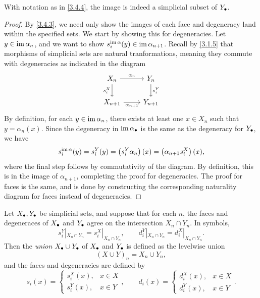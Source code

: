 \begin{claim}\label{3.4.5}
    With notation as in \cref{3.4.4}, the image is indeed a simplicial subset of $Y_\bullet$.
\end{claim}
\begin{proof}
    By \cref{3.4.3}, we need only show the images of each face and degeneracy land within the specified sets. We start by showing this for degeneracies. Let $y\in\operatorname{im}\alpha_n$, and we want to show $s_i^{\operatorname{im}\alpha}(y)\in\operatorname{im}\alpha_{n+1}$. Recall by \cref{3.1.5} that morphisms of simplicial sets are natural tranformations, meaning they commute with degeneracies as indicated in the diagram
    \[\begin{tikzcd}
	{X_n} & {Y_n} \\
	{X_{n+1}} & {Y_{n+1}}
	\arrow["{\alpha_n}", from=1-1, to=1-2]
	\arrow["{s_i^X}"', from=1-1, to=2-1]
	\arrow["{s_i^Y}", from=1-2, to=2-2]
	\arrow["{\alpha_{n+1}}"', from=2-1, to=2-2]
    \end{tikzcd}\]
    By definition, for each $y\in\operatorname{im}\alpha_n$, there exists at least one $x\in X_n$ such that $y=\alpha_n(x)$. Since the degeneracy in $\operatorname{im}\alpha_\bullet$ is the same as the degeneracy for $Y_\bullet$, we have
    \[
    s^{\operatorname{im}\alpha}_i(y)=s^Y_i(y)=\left(s^Y_i\alpha_n\right)(x)=\left(\alpha_{n+1}s_i^X\right)(x),
    \]
    where the final step follows by commutativity of the diagram. By definition, this is in the image of $\alpha_{n+1}$, completing the proof for degeneracies. The proof for faces is the same, and is done by constructing the corresponding naturality diagram for faces instead of degeneracies.
\end{proof}

\begin{definition}\label{3.4.6}
    Let $X_\bullet,Y_\bullet$ be simplicial sets, and suppose that for each $n$, the faces and degeneraces of $X_\bullet$ and $Y_\bullet$ agree on the intersection $X_n\cap Y_n$. In symbols,
    \[
    s^Y_i|_{X_n\cap Y_n}=s_i^X|_{X_n\cap Y_n},\qquad d^Y_i|_{X_n\cap Y_n}=d_i^X|_{X_n\cap Y_n}.
    \]
    Then the \emph{union} $X_\bullet\cup Y_\bullet$ of $X_\bullet$ and $Y_\bullet$ is defined as the levelwise union
    \[
    (X\cup Y)_n=X_n\cup Y_n,
    \]
    and the faces and degeneracies are defined by
    \[
    s_i(x) = \begin{cases}
        s_i^X(x),&x\in X\\
        s_i^Y(x),&x\in Y
    \end{cases},\qquad d_i(x) = \begin{cases}
        d_i^X(x),&x\in X\\
        d_i^Y(x),&x\in Y
    \end{cases}.
    \]
\end{definition}

